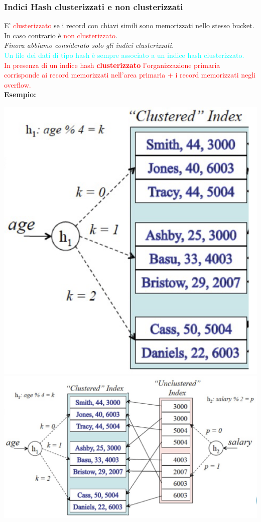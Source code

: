 \documentclass[12pt, a4paper]{report}
\begin{document}
    \subsubsection{Indici Hash clusterizzati e non clusterizzati}
    E' \textcolor{red}{clusterizzato} se i record con chiavi simili sono memorizzati nello stesso bucket. In caso contrario è \textcolor{red}{non clusterizzato}.\\
    \textit{Finora abbiamo considerato solo gli indici clusterizzati.}
    \\\textcolor{Cyan}{Un file dei dati di tipo hash è sempre associato a un indice hash clusterizzato.}
    \\\textcolor{red}{In presenza di un indice hash \textbf{clusterizzato} l'organizzazione primaria corrisponde ai record memorizzati nell'area primaria + i record memorizzati negli overflow.}\\
    \textbf{Esempio:}
    \begin{center}
        \includegraphics[scale=0.5]{Appunti Latex/Immagini/esempioindicihashclusterizzato.png}
        \includegraphics[scale=0.5]{Appunti Latex/Immagini/esempioindicihashnonclusterizzato.png}
    \end{center}
\end{document}
